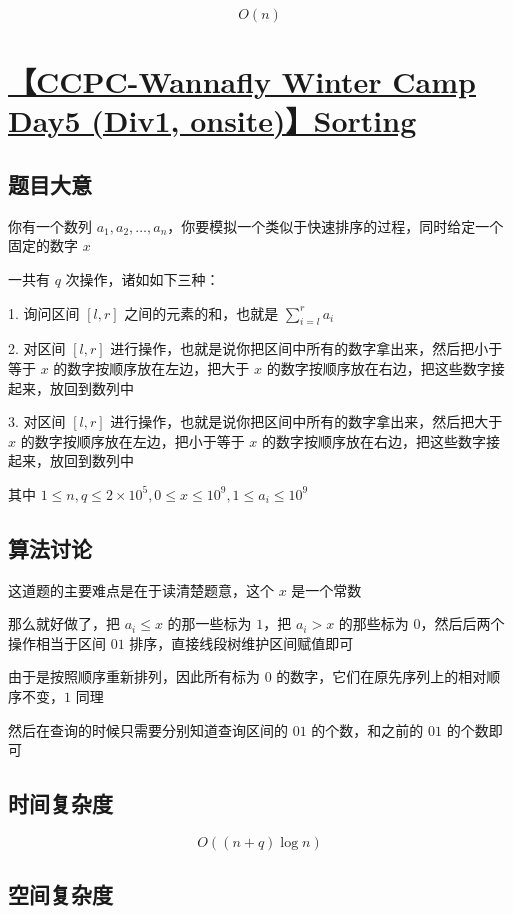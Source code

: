 \documentclass[UTF8]{article}
\begin{document}
$$
O(n)
$$

\section{\href{https://www.zhixincode.com/contest/20/problem/I?problem_id=304}{【CCPC-Wannafly Winter Camp Day5 (Div1, onsite)】Sorting}}

\subsection{题目大意}

你有一个数列 $a_1, a_2, \dots, a_n$，你要模拟一个类似于快速排序的过程，同时给定一个固定的数字 $x$

一共有 $q$ 次操作，诸如如下三种：

1. 询问区间 $[l, r]$ 之间的元素的和，也就是 $\sum_{i=l}^r a_i$

2. 对区间 $[l,r]$ 进行操作，也就是说你把区间中所有的数字拿出来，然后把小于等于 $x$ 的数字按顺序放在左边，把大于 $x$ 的数字按顺序放在右边，把这些数字接起来，放回到数列中

3. 对区间 $[l,r]$ 进行操作，也就是说你把区间中所有的数字拿出来，然后把大于 $x$ 的数字按顺序放在左边，把小于等于 $x$ 的数字按顺序放在右边，把这些数字接起来，放回到数列中

其中 $1 \le n,q \le 2 \times 10^5, 0 \le x \le 10^9, 1 \le a_i \le 10^9$

\subsection{算法讨论}

这道题的主要难点是在于读清楚题意，这个 $x$ 是一个常数

那么就好做了，把 $a_i \le x$ 的那一些标为 $1$，把 $a_i > x$ 的那些标为 $0$，然后后两个操作相当于区间 $01$ 排序，直接线段树维护区间赋值即可

由于是按照顺序重新排列，因此所有标为 $0$ 的数字，它们在原先序列上的相对顺序不变，$1$ 同理

然后在查询的时候只需要分别知道查询区间的 $01$ 的个数，和之前的 $01$ 的个数即可

\subsection{时间复杂度}

$$
O((n+q) \log n)
$$

\subsection{空间复杂度}
\end{document}
